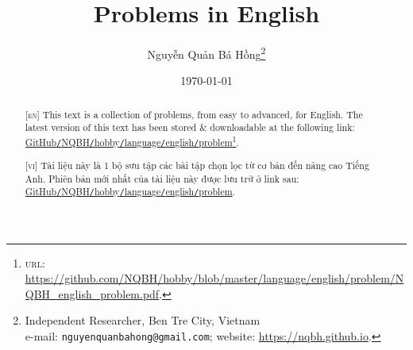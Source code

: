 \documentclass{article}
\title{Problems in English}
\author{Nguyễn Quản Bá Hồng\footnote{Independent Researcher, Ben Tre City, Vietnam\\e-mail: \texttt{nguyenquanbahong@gmail.com}; website: \url{https://nqbh.github.io}.}}
\date{\today}
\numberwithin{equation}{section}
\begin{document}
\maketitle
\begin{abstract}
	\textsc{[en]} This text is a collection of problems, from easy to advanced, for English. The latest version of this text has been stored \& downloadable at the following link: \href{https://github.com/NQBH/hobby/blob/master/language/english/problem/NQBH_english_problem.pdf}{GitHub\texttt{/}NQBH\texttt{/}hobby\texttt{/}language\texttt{/}english\texttt{/}problem}\footnote{\textsc{url}: \url{https://github.com/NQBH/hobby/blob/master/language/english/problem/NQBH_english_problem.pdf}.}.
	\vspace{2mm}
	
	\textsc{[vi]} Tài liệu này là 1 bộ sưu tập các bài tập chọn lọc từ cơ bản đến nâng cao Tiếng Anh. Phiên bản mới nhất của tài liệu này được lưu trữ ở link sau: \href{https://github.com/NQBH/hobby/blob/master/language/english/problem/NQBH_english_problem.pdf}{GitHub\texttt{/}NQBH\texttt{/}hobby\texttt{/}language\texttt{/}english\texttt{/}problem}.
\end{abstract}
\tableofcontents
\newpage

\end{document}
